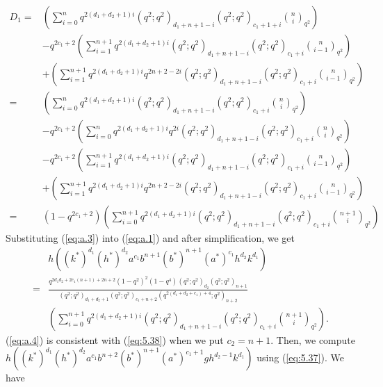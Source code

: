 \documentclass[table,a4paper,reqno]{amsart}
\numberwithin{equation}{section}
\theoremstyle{definition}
\begin{document}
\begin{equation}\label{eq:a.3}
    \begin{split}
        D_1=&\left(\sum_{i=0}^{n}q^{2(d_1+d_2+1)i}(q^2;q^2)_{d_1+n+1-i}(q^2;q^2)_{c_1+1+i}{n\choose i}_{q^2}\right)\\
        &-q^{2c_1+2}\left(\sum_{i=1}^{n+1}q^{2(d_1+d_2+1)i}(q^2;q^2)_{d_1+n+1-i}(q^2;q^2)_{c_1+i}{n\choose i-1}_{q^2}\right)\\
        &+\left(\sum_{i=1}^{n+1}q^{2(d_1+d_2+1)i}q^{2n+2-2i}(q^2;q^2)_{d_1+n+1-i}(q^2;q^2)_{c_1+i}{n\choose i-1}_{q^2}\right)\\
         =&\left(\sum_{i=0}^{n}q^{2(d_1+d_2+1)i}(q^2;q^2)_{d_1+n+1-i}(q^2;q^2)_{c_1+i}{n\choose i}_{q^2}\right)\\
         &-q^{2c_1+2}\left(\sum_{i=0}^{n}q^{2(d_1+d_2+1)i}q^{2i}(q^2;q^2)_{d_1+n+1-i}(q^2;q^2)_{c_1+i}{n\choose i}_{q^2}\right)\\
        &-q^{2c_1+2}\left(\sum_{i=1}^{n+1}q^{2(d_1+d_2+1)i}(q^2;q^2)_{d_1+n+1-i}(q^2;q^2)_{c_1+i}{n\choose i-1}_{q^2}\right)\\
        &+\left(\sum_{i=1}^{n+1}q^{2(d_1+d_2+1)i}q^{2n+2-2i}(q^2;q^2)_{d_1+n+1-i}(q^2;q^2)_{c_1+i}{n\choose i-1}_{q^2}\right)\\
        =&(1-q^{2c_1+2})\left(\sum_{i=0}^{n+1}q^{2(d_1+d_2+1)i}(q^2;q^2)_{d_1+n+1-i}(q^2;q^2)_{c_1+i}{n+1\choose i}_{q^2}\right)
    \end{split}
\end{equation}
Substituting (\ref{eq:a.3}) into (\ref{eq:a.1}) and after simplification, we get
\begin{equation}\label{eq:a.4}
    \begin{split}
        &h\left((k^*)^{d_1}(h^*)^{d_2}a^{c_1}b^{n+1}(b^*)^{n+1}(a^*)^{c_1}h^{d_2}k^{d_1}\right)\\
        =&\frac{q^{2d_1d_2+2c_1(n+1)+2n+2}(1-q^2)^2(1-q^4)(q^2;q^2)_{d_2}(q^2;q^2)_{n+1}}{(q^2;q^2)_{d_1+d_2+1}(q^2;q^2)_{c_1+n+2}(q^{2(d_1+d_2+c_1)+4};q^2)_{n+2}}\\
        &\left(\sum_{i=0}^{n+1}q^{2(d_1+d_2+1)i}(q^2;q^2)_{d_1+n+1-i}(q^2;q^2)_{c_1+i}{n+1\choose i}_{q^2}\right).
    \end{split}
\end{equation}
(\ref{eq:a.4}) is consistent with (\ref{eq:5.38}) when we put $c_2=n+1$. Then, we compute $h\left((k^*)^{d_1}(h^*)^{d_2}a^{c_1}b^{n+2}(b^*)^{n+1}(a^*)^{c_1+1}gh^{d_2-1}k^{d_1}\right)$ using (\ref{eq:5.37}). We have
\end{document}
